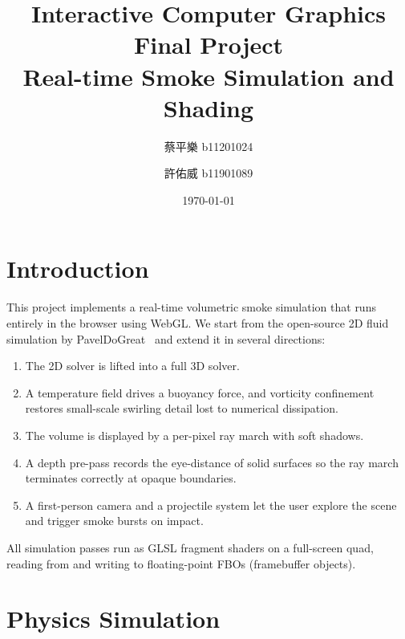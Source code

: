 \documentclass[a4paper, 12pt]{article}
\title{Interactive Computer Graphics Final Project\\[0.3em]
       \large{Real-time Smoke Simulation and Shading}}
\author{蔡平樂 b11201024 \and 許佑威 b11901089}
\date{\today}
\begin{document}
\vspace{-2em}
\maketitle
\vspace{-3em}

\section{Introduction}

This project implements a real-time volumetric smoke simulation that runs
entirely in the browser using WebGL.
We start from the open-source 2D fluid simulation by
PavelDoGreat~\cite{pavelfluid} and extend it in several directions:

\begin{enumerate}[leftmargin=*, nosep]
  \item The 2D solver is lifted into a full 3D solver.
  \item A temperature field drives a buoyancy force, and vorticity confinement
        restores small-scale swirling detail lost to numerical dissipation.
  \item The volume is displayed by a per-pixel ray march with soft shadows.
  \item A depth pre-pass records the eye-distance of solid surfaces so the ray
        march terminates correctly at opaque boundaries.
  \item A first-person camera and a projectile system let the user explore the
        scene and trigger smoke bursts on impact.
\end{enumerate}

All simulation passes run as GLSL fragment shaders on a full-screen quad,
reading from and writing to floating-point FBOs (framebuffer objects).

\section{Physics Simulation}
\end{document}
